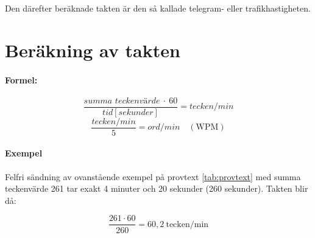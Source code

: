 Den därefter beräknade takten är den så kallade telegram- eller trafikhastigheten.

\section[Taktberäkning]{Beräkning av takten}

\paragraph{Formel:}
\[\frac{\textit{summa\ teckenvärde}\ \cdot\ 60}{\textit{tid} [\textit{sekunder}]}
= \textit{tecken/min}\]
\[\frac{\textit{tecken/min}}{5} = \textit{ord/min}\quad (\text{WPM})\]

\paragraph{Exempel}
Felfri sändning av ovanstående exempel på provtext \ref{tab:provtext} med summa
teckenvärde 261 tar exakt 4 minuter och 20 sekunder (260 sekunder).
Takten blir då:

$$\frac{261 \cdot 60}{260} = 60,2\ \mathrm{tecken/min}$$

\label{morsealfabetet}

